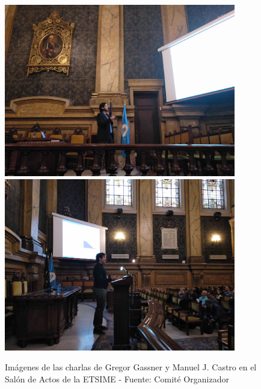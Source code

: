 \documentclass[twoside]{article}
\begin{document}
\begin{center}
\begin{figure}
	\centering
		\includegraphics[width=0.9\textwidth]{GGassner}
		\includegraphics[width=0.9\textwidth]{MCastro}
	\label{fig:Salon1}
	\caption{Imágenes de las charlas de Gregor Gassner y Manuel J. Castro en el Salón de Actos de la ETSIME  - Fuente: Comité Organizador}
\end{figure}
\end{center}
%
\end{document}
